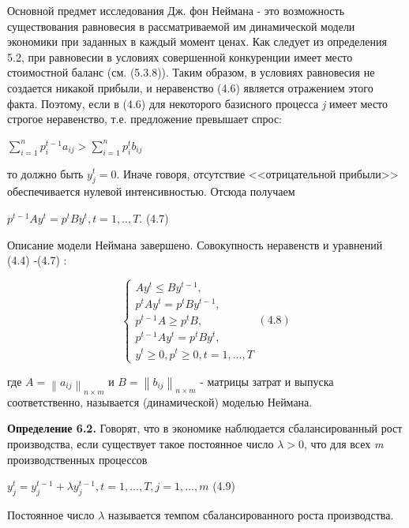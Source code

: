\documentclass[12pt, 4paper]{book}
\begin{document}
{Основной предмет исследования Дж. фон Неймана - это возможность существования равновесия в рассматриваемой им динамической модели экономики при заданных в каждый момент ценах. Как следует из определения 5.2, при равновесии в условиях совершенной конкуренции имеет место стоимостной баланс (см. (5.3.8)). Таким образом, в условиях равновесия не создается никакой прибыли, и неравенство (4.6)  является отражением этого факта. Поэтому, если в (4.6) для некоторого базисного процесса \textit{j} имеет место строгое неравенство, т.е. предложение превышает спрос:
\begin{center}
$\sum\limits_{i=1}^{n}p_{i}^{t-1} a_{ij} > \sum\limits_{i=1}^{n}p_{i}^{t}b_{ij}$
\end{center}
то должно быть $y_{j}^t = 0$. Иначе говоря, отсутствие <<отрицательной прибыли>> обеспечивается нулевой интенсивностью. Отсюда получаем
\begin{center}
$p^{t-1}A y^{t} = p^t B y^t, t=1,..,T.$ (4.7)
\end{center}
\par

Описание модели Неймана завершено. Совокупность неравенств и уравнений (4.4) -(4.7) :
\begin{center}
$$\left\{
\begin{aligned}
A y^t \leq B y^{t-1},\\
p^t A y^t = p^t B y^{t-1},\\
p^{t-1} A \geq p^t B ,\\
p^{t-1} A y^t = p^t B y^t ,\\
y^t \geq 0,p^t \geq 0, t=1,...,T 
\end{aligned} (4.8)
\right.$$
\end{center}
где $A = \left\|a_{ij}\right\|_{n \times m} $ и $B=\left\|b_{ij}\right\|_{n \times m}$ - матрицы затрат и выпуска соответственно, называется (динамической) моделью Неймана.
\par

\textbf{Определение 6.2.} Говорят, что в экономике наблюдается сбалансированный рост производства, если существует такое постоянное число $\lambda > 0$, что для всех \textit{m} производственных процессов
\begin{center}
$y_{j}^t = y_{j}^{t-1} + \lambda y_{j}^{t-1}, t=1,...,T, j=1,...,m$ (4.9)
\end{center}
\par

Постоянное число $\lambda$ называется темпом сбалансированного роста производства.
\par

}
\end{document}
